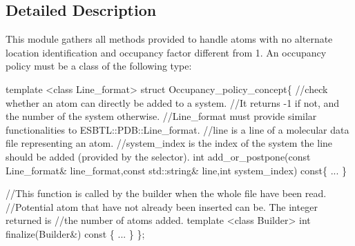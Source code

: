 \subsection{Detailed Description}
This module gathers all methods provided to handle atoms with no alternate location identification and occupancy factor different from 1. An occupancy policy must be a class of the following type\+: 
\begin{DoxyCode}
\textcolor{keyword}{template} <\textcolor{keyword}{class} Line\_format>
\textcolor{keyword}{struct }Occupancy\_policy\_concept\{
  \textcolor{comment}{//check whether an atom can directly be added to a system. }
  \textcolor{comment}{//It returns -1 if not, and the number of the system otherwise.}
  \textcolor{comment}{//Line\_format must provide  similar functionalities to ESBTL::PDB::Line\_format.}
  \textcolor{comment}{//line is a line of a molecular data file representing an atom.}
  \textcolor{comment}{//system\_index is the index of the system the line should be added (provided by the selector).}
  \textcolor{keywordtype}{int} add\_or\_postpone(\textcolor{keyword}{const} Line\_format& line\_format,\textcolor{keyword}{const} std::string& line,\textcolor{keywordtype}{int} system\_index)\textcolor{keyword}{ const}\{ ... \}
  
  \textcolor{comment}{//This function is called by the builder when the whole file have been read.}
  \textcolor{comment}{//Potential atom that have not already been inserted can be. The integer returned is}
  \textcolor{comment}{//the number of atoms added.}
  \textcolor{keyword}{template} <\textcolor{keyword}{class} Builder> \textcolor{keywordtype}{int} finalize(Builder&)\textcolor{keyword}{ const }\{ ... \}
\};
\end{DoxyCode}
 